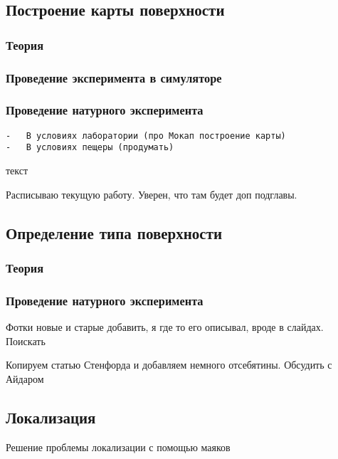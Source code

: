 
\subsection{Построение карты
поверхности}


\subsubsection{Теория}


\subsubsection{Проведение эксперимента в
симуляторе}


\subsubsection{Проведение натурного
эксперимента}

\begin{verbatim}
-   В условиях лаборатории (про Мокап построение карты)
-   В условиях пещеры (продумать)
\end{verbatim}

текст

Расписываю текущую работу. Уверен, что там будет доп подглавы.


\subsection{Определение типа
поверхности}


\subsubsection{Теория}


\subsubsection{Проведение натурного
эксперимента}

Фотки новые и старые добавить, я где то его описывал, вроде в слайдах.
Поискать

Копируем статью Стенфорда и добавляем немного отсебятины. Обсудить с
Айдаром


\subsection{Локализация}

Решение проблемы локализации с помощью маяков

